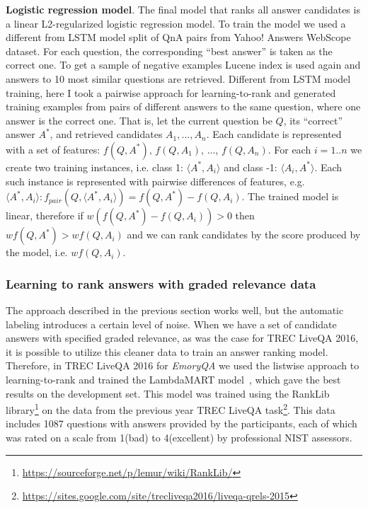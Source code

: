 \textbf{Logistic regression model}.
The final model that ranks all answer candidates is a linear L2-regularized logistic regression model.
To train the model we used a different from LSTM model split of QnA pairs from Yahoo! Answers WebScope dataset.
For each question, the corresponding ``best answer'' is taken as the correct one.
To get a sample of negative examples Lucene index is used again and answers to 10 most similar questions are retrieved.
Different from LSTM model training, here I took a pairwise approach for learning-to-rank and generated training examples from pairs of different answers to the same question, where one answer is the correct one.
That is, let the current question be $Q$, its ``correct'' answer $A^*$, and retrieved candidates $A_1, ..., A_n$.
Each candidate is represented with a set of features: $f(Q, A^*)$, $f(Q, A_1)$, ..., $f(Q, A_n)$.
For each $i=1..n$ we create two training instances, i.e. class 1: $\langle A^*, A_i\rangle$ and class -1: $\langle A_i, A^*\rangle$.
Each such instance is represented with pairwise differences of features, e.g. $\langle A^*, A_i\rangle: f_{pair}(Q, \langle A^*, A_i\rangle) = f(Q, A^*) - f(Q, A_i)$.
The trained model is linear, therefore if $w(f(Q, A^*) - f(Q, A_i)) > 0$ then $w f(Q, A^*) > w f(Q, A_i)$ and we can rank candidates by the score produced by the model, i.e. $w f(Q, A_i)$.

\subsubsection{Learning to rank answers with graded relevance data}
\label{table:non-factoid:system:rel_training}

The approach described in the previous section works well, but the automatic labeling introduces a certain level of noise.
When we have a set of candidate answers with specified graded relevance, as was the case for TREC LiveQA 2016, it is possible to utilize this cleaner data to train an answer ranking model.
Therefore, in TREC LiveQA 2016 for \textit{EmoryQA} we used the listwise approach to learning-to-rank and trained the LambdaMART model~\cite{burges2010ranknet}, which gave the best results on the development set.
This model was trained using the RankLib library\footnote{\href{url}{https://sourceforge.net/p/lemur/wiki/RankLib/}} on the data from the previous year TREC LiveQA task\footnote{\href{url}{https://sites.google.com/site/trecliveqa2016/liveqa-qrels-2015}}.
This data includes 1087 questions with answers provided by the participants, each of which was rated on a scale from 1(bad) to 4(excellent) by professional NIST assessors.



